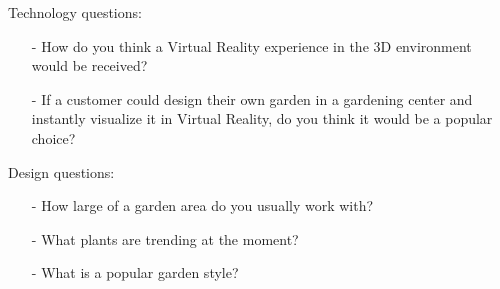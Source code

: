 Technology questions:
\begin{itemize}
	\item[-] How do you think a Virtual Reality experience in the 3D environment would be received?
	\item[-] If a customer could design their own garden in a gardening center and instantly visualize it in Virtual Reality, do you think it would be a popular choice? \\
\end{itemize}

Design questions:
\begin{itemize}
	\item[-] How large of a garden area do you usually work with?
	\item[-] What plants are trending at the moment?
	\item[-] What is a popular garden style?
\end{itemize}